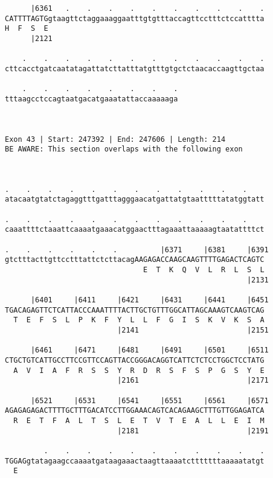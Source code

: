 \documentclass{article}
\begin{document}
\begin{Verbatim}
      |6361   .    .    .    .    .    .    .    .    .    .
CATTTTAGTGgtaagttctaggaaaggaatttgtgtttaccagttcctttctccatttta
H  F  S  E                                                  
      |2121                                                 
  
    .    .    .    .    .    .    .    .    .    .    .    .
cttcacctgatcaatatagattatcttatttatgtttgtgctctaacaccaagttgctaa
                                                            
    .    .    .    .    .    .    .    .
tttaagcctccagtaatgacatgaaatattaccaaaaaga
                                        
                                        
 
Exon 43 | Start: 247392 | End: 247606 | Length: 214
BE AWARE: This section overlaps with the following exon



.    .    .    .    .    .    .    .    .    .    .    .    
atacaatgtatctagaggtttgatttagggaacatgattatgtaatttttatatggtatt
                                                            
.    .    .    .    .    .    .    .    .    .    .    .    
caaattttctaaattcaaaatgaaacatggaactttagaaattaaaaagtaatattttct
                                                            
.    .    .    .    .    .          |6371     |6381     |6391
gtctttacttgttcctttattctcttacagAAGAGACCAAGCAAGTTTTGAGACTCAGTC
                                E  T  K  Q  V  L  R  L  S  L
                                                        |2131
  
      |6401     |6411     |6421     |6431     |6441     |6451
TGACAGAGTTCTCATTACCCAAATTTTACTTGCTGTTTGGCATTAGCAAAGTCAAGTCAG
  T  E  F  S  L  P  K  F  Y  L  L  F  G  I  S  K  V  K  S  A
                          |2141                         |2151
  
      |6461     |6471     |6481     |6491     |6501     |6511
CTGCTGTCATTGCCTTCCGTTCCAGTTACCGGGACAGGTCATTCTCTCCTGGCTCCTATG
  A  V  I  A  F  R  S  S  Y  R  D  R  S  F  S  P  G  S  Y  E
                          |2161                         |2171
  
      |6521     |6531     |6541     |6551     |6561     |6571
AGAGAGAGACTTTTGCTTTGACATCCTTGGAAACAGTCACAGAAGCTTTGTTGGAGATCA
  R  E  T  F  A  L  T  S  L  E  T  V  T  E  A  L  L  E  I  M
                          |2181                         |2191
  
         .    .    .    .    .    .    .    .    .    .    .
TGGAGgtatagaagccaaaatgataagaaactaagttaaaatctttttttaaaaatatgt
  E                                                         
                                                            

\end{Verbatim}
\end{document}
